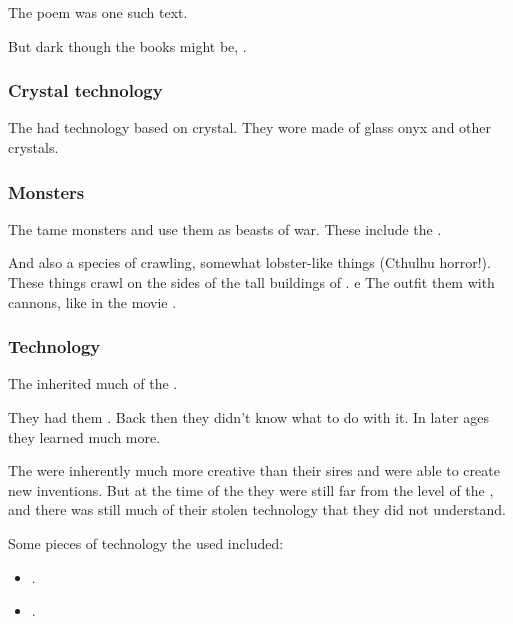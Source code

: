 The poem \WanderersInDarknessEmph was one such  text. 

But dark though the \pps{\resphain} books might be, . 





\subsubsection{Crystal technology}
The \resphain{} had technology based on crystal. 
They wore \armour made of glass onyx and other crystals. 





\subsubsection{Monsters}
The \resphain{} tame monsters and use them as beasts of war. 
These include the . 

And also a species of crawling, somewhat lobster-like things (Cthulhu horror!). 
These things crawl on the sides of the tall buildings of \Nyx. e
The \resphain{} outfit them with cannons, like in the movie \cite{Movie:D-War}. 





\subsubsection{Technology}
The \resphain{} inherited much of the . 

They had them . 
Back then they didn't know what to do with it. 
In later ages they learned much more. 

The \resphain{} were inherently much more creative than their \bane{} sires and were able to create new inventions. 
But at the time of the \thirdbanewar they were still far from the level of the \voyagers, and there was still much of their stolen \voyager{} technology that they did not understand. 

Some pieces of technology the \resphain used included:
\begin{itemize}
  \item {}.
  \item {}.
\end{itemize}


